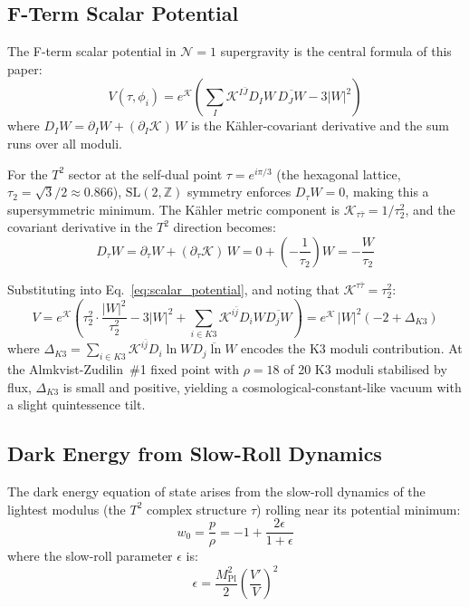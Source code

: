 \subsection{F-Term Scalar Potential}
\label{subsec:scalar_potential}

The F-term scalar potential in $\mathcal{N}=1$ supergravity is the central formula of this paper:
\begin{equation}
    \boxed{\;V(\tau, \phi_i) = e^{\mathcal{K}} \left( \sum_{I} \mathcal{K}^{I\bar{J}} D_I W \, \overline{D_J W} - 3|W|^2 \right)\;}
    \label{eq:scalar_potential}
\end{equation}
where $D_I W = \partial_I W + (\partial_I \mathcal{K})\, W$ is the K\"ahler-covariant derivative and the sum runs over all moduli.

For the $T^2$ sector at the self-dual point $\tau = e^{i\pi/3}$ (the hexagonal lattice, $\tau_2 = \sqrt{3}/2 \approx 0.866$), $\text{SL}(2,\mathbb{Z})$ symmetry enforces $D_\tau W = 0$, making this a supersymmetric minimum.  The K\"ahler metric component is $\mathcal{K}_{\tau\bar{\tau}} = 1/\tau_2^2$, and the covariant derivative in the $T^2$ direction becomes:
\begin{equation}
    D_\tau W = \partial_\tau W + (\partial_\tau \mathcal{K})\, W = 0 + \left(-\frac{1}{\tau_2}\right) W = -\frac{W}{\tau_2}
\end{equation}

Substituting into Eq.~\eqref{eq:scalar_potential}, and noting that $\mathcal{K}^{\tau\bar{\tau}} = \tau_2^2$:
\begin{equation}
    V = e^{\mathcal{K}} \left( \tau_2^2 \cdot \frac{|W|^2}{\tau_2^2} - 3|W|^2 + \sum_{i \in K3} \mathcal{K}^{i\bar{j}} D_i W \overline{D_j W} \right) = e^{\mathcal{K}}\, |W|^2 \left( -2 + \Delta_{K3} \right)
\end{equation}
where $\Delta_{K3} = \sum_{i \in K3} \mathcal{K}^{i\bar{j}} D_i \ln W \overline{D_j \ln W}$ encodes the K3 moduli contribution.  At the Almkvist-Zudilin~\#1 fixed point with $\rho = 18$ of 20 K3 moduli stabilised by flux, $\Delta_{K3}$ is small and positive, yielding a cosmological-constant-like vacuum with a slight quintessence tilt.

\subsection{Dark Energy from Slow-Roll Dynamics}
\label{subsec:dark_energy}

The dark energy equation of state arises from the slow-roll dynamics of the lightest modulus (the $T^2$ complex structure $\tau$) rolling near its potential minimum:
\begin{equation}
    w_0 = \frac{p}{\rho} = -1 + \frac{2\epsilon}{1 + \epsilon}
    \label{eq:w0}
\end{equation}
where the slow-roll parameter $\epsilon$ is:
\begin{equation}
    \epsilon = \frac{M_{\text{Pl}}^2}{2} \left( \frac{V'}{V} \right)^2
    \label{eq:slow_roll}
\end{equation}

